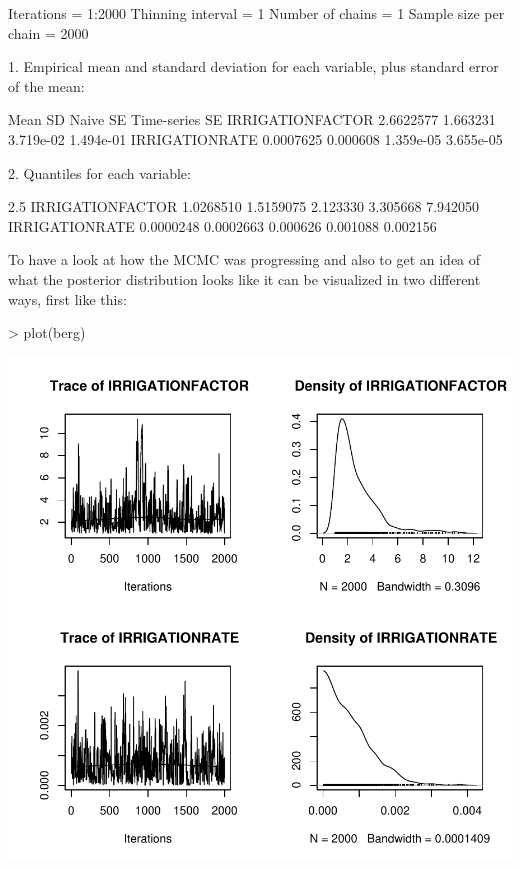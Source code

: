 \documentclass{scrartcl}
\begin{document}
\begin{Schunk}
\begin{Soutput}
Iterations = 1:2000
Thinning interval = 1 
Number of chains = 1 
Sample size per chain = 2000 

1. Empirical mean and standard deviation for each variable,
   plus standard error of the mean:

                      Mean       SD  Naive SE Time-series SE
IRRIGATIONFACTOR 2.6622577 1.663231 3.719e-02      1.494e-01
IRRIGATIONRATE   0.0007625 0.000608 1.359e-05      3.655e-05

2. Quantiles for each variable:

                      2.5%
IRRIGATIONFACTOR 1.0268510 1.5159075 2.123330 3.305668 7.942050
IRRIGATIONRATE   0.0000248 0.0002663 0.000626 0.001088 0.002156
\end{Soutput}
\end{Schunk}
To have a look at how the MCMC was progressing and also to get an idea
of what the posterior distribution looks like it can be visualized in
two different ways, first like this: 

\begin{Schunk}
\begin{Sinput}
> plot(berg)
\end{Sinput}
\end{Schunk}
\includegraphics{figures/f-plotbay}
\end{document}
